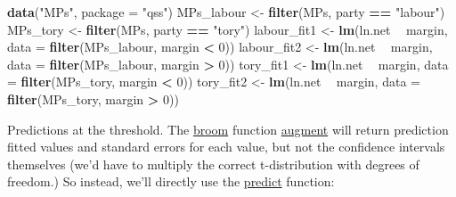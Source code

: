 \documentclass[]{book}
\newenvironment{Shaded}{\begin{snugshade}}{\end{snugshade}}
\newcommand{\KeywordTok}[1]{\textcolor[rgb]{0.13,0.29,0.53}{\textbf{#1}}}
\newcommand{\DataTypeTok}[1]{\textcolor[rgb]{0.13,0.29,0.53}{#1}}
\newcommand{\DecValTok}[1]{\textcolor[rgb]{0.00,0.00,0.81}{#1}}
\newcommand{\StringTok}[1]{\textcolor[rgb]{0.31,0.60,0.02}{#1}}
\newcommand{\OperatorTok}[1]{\textcolor[rgb]{0.81,0.36,0.00}{\textbf{#1}}}
\newcommand{\NormalTok}[1]{#1}
\theoremstyle{definition}
\theoremstyle{definition}
\theoremstyle{definition}
\theoremstyle{remark}
\begin{document}
\begin{Shaded}
\begin{Highlighting}[]
\KeywordTok{data}\NormalTok{(}\StringTok{"MPs"}\NormalTok{, }\DataTypeTok{package =} \StringTok{"qss"}\NormalTok{)}
\NormalTok{MPs_labour <-}\StringTok{ }\KeywordTok{filter}\NormalTok{(MPs, party }\OperatorTok{==}\StringTok{ "labour"}\NormalTok{)}
\NormalTok{MPs_tory <-}\StringTok{ }\KeywordTok{filter}\NormalTok{(MPs, party }\OperatorTok{==}\StringTok{ "tory"}\NormalTok{)}
\NormalTok{labour_fit1 <-}\StringTok{ }\KeywordTok{lm}\NormalTok{(ln.net }\OperatorTok{~}\StringTok{ }\NormalTok{margin, }\DataTypeTok{data =} \KeywordTok{filter}\NormalTok{(MPs_labour, margin }\OperatorTok{<}\StringTok{ }\DecValTok{0}\NormalTok{))}
\NormalTok{labour_fit2 <-}\StringTok{ }\KeywordTok{lm}\NormalTok{(ln.net }\OperatorTok{~}\StringTok{ }\NormalTok{margin, }\DataTypeTok{data =} \KeywordTok{filter}\NormalTok{(MPs_labour, margin }\OperatorTok{>}\StringTok{ }\DecValTok{0}\NormalTok{))}
\NormalTok{tory_fit1 <-}\StringTok{ }\KeywordTok{lm}\NormalTok{(ln.net }\OperatorTok{~}\StringTok{ }\NormalTok{margin, }\DataTypeTok{data =} \KeywordTok{filter}\NormalTok{(MPs_tory, margin }\OperatorTok{<}\StringTok{ }\DecValTok{0}\NormalTok{))}
\NormalTok{tory_fit2 <-}\StringTok{ }\KeywordTok{lm}\NormalTok{(ln.net }\OperatorTok{~}\StringTok{ }\NormalTok{margin, }\DataTypeTok{data =} \KeywordTok{filter}\NormalTok{(MPs_tory, margin }\OperatorTok{>}\StringTok{ }\DecValTok{0}\NormalTok{))}
\end{Highlighting}
\end{Shaded}

Predictions at the threshold. The
\href{https://cran.r-project.org/package=broom}{broom} function
\href{https://www.rdocumentation.org/packages/broom/topics/augment}{augment}
will return prediction fitted values and standard errors for each value,
but not the confidence intervals themselves (we'd have to multiply the
correct t-distribution with degrees of freedom.) So instead, we'll
directly use the
\href{https://www.rdocumentation.org/packages/stats/topics/predict.lm}{predict}
function:
\end{document}

